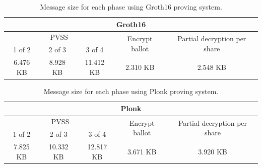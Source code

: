 \documentclass{article}
\begin{document}
\begin{table}
\centering
\label{table:groth16-size}
\caption{Message size for each phase using Groth16 proving system.}
\begin{tabular}{|c|c|c|c|c|}
    \hline
    \multicolumn{5}{|c|}{Groth16} \\
    \hline
    \multicolumn{3}{|c|}{PVSS} & \multirow{2}{*}{Encrypt ballot} & \multirow{2}{*}{Partial decryption per share} \\
    \cline{1-3}
    1 of 2 & 2 of 3 & 3 of 4 & & \\
    \hline
    6.476 KB& 8.928 KB & 11.412 KB & 2.310 KB & 2.548 KB\\
    \hline
\end{tabular}
\end{table}

\begin{table}
\centering
\label{table:plonk-size}
\caption{Message size for each phase using Plonk proving system.}
\begin{tabular}{|c|c|c|c|c|}
    \hline
    \multicolumn{5}{|c|}{Plonk} \\
    \hline
    \multicolumn{3}{|c|}{PVSS} & \multirow{2}{*}{Encrypt ballot} & \multirow{2}{*}{Partial decryption per share} \\
    \cline{1-3}
    1 of 2 & 2 of 3 & 3 of 4 & & \\
    \hline
    7.825 KB& 10.332 KB & 12.817 KB & 3.671 KB & 3.920 KB\\
    \hline
\end{tabular}
\end{table}
\end{document}
